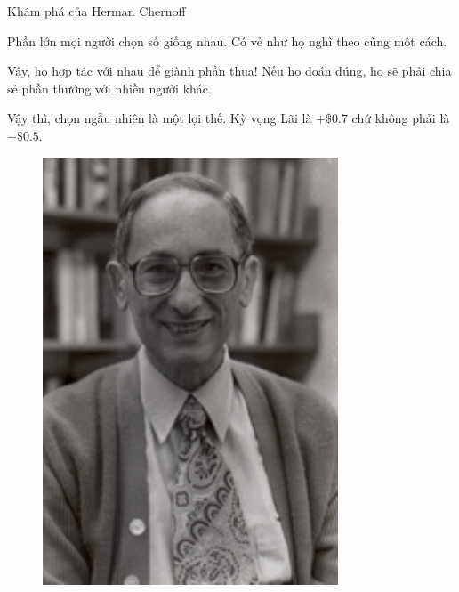 \begin{frame}{Khám phá của Herman Chernoff}
\begin{minipage}[c]{0.6\textwidth}
	Phần lớn mọi người chọn số giống nhau. Có vẻ như họ nghĩ theo cũng một cách.
	\bigskip

	Vậy, họ hợp tác với nhau để giành phần thua! Nếu họ đoán đúng, họ sẽ phải chia sẻ phần thưởng với nhiều người khác.
	\bigskip
		
	Vậy thì, chọn ngẫu nhiên là một lợi thế. Kỳ vọng Lãi  là $+\$0.7$ chứ không phải là $-\$0.5$.
\end{minipage}\qquad 
	\begin{minipage}[c]{0.3\textwidth}
		\begin{figure}[h]
		  \centering
		    \includegraphics[width=\textwidth]{Chernoff.pdf}
		\end{figure}
		
	\end{minipage}
\end{frame}
